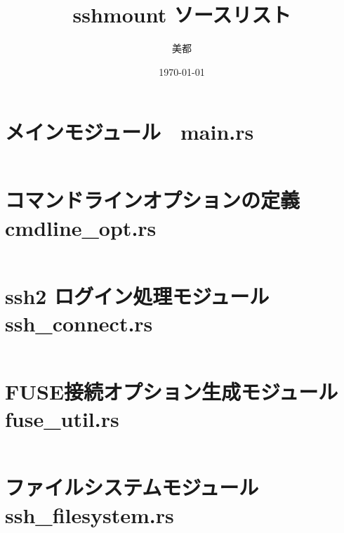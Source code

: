 \documentclass[paper=a4paper, fontsize=10pt, head_space=10mm, foot_space=17mm, gutter=17mm, line_length=185mm, twoside]{jlreq}
\title{sshmount ソースリスト}
\author{美都}
\date{\today}
\begin{document}
\maketitle
\tableofcontents
\clearpage

\section{メインモジュール　main.rs}
\inputminted[linenos, breaklines]{rust}{src/main.rs}
\clearpage

\section{コマンドラインオプションの定義 cmdline\_opt.rs}
\inputminted[linenos, breaklines]{rust}{src/cmdline_opt.rs}
\clearpage

\section{ssh2 ログイン処理モジュール ssh\_connect.rs}
\inputminted[linenos, breaklines]{rust}{src/ssh_connect.rs}
\clearpage

\section{FUSE接続オプション生成モジュール fuse\_util.rs}
\inputminted[linenos, breaklines]{rust}{src/fuse_util.rs}
\clearpage

\section{ファイルシステムモジュール ssh\_filesystem.rs}
\inputminted[linenos, breaklines]{rust}{src/ssh_filesystem.rs}
\end{document}
